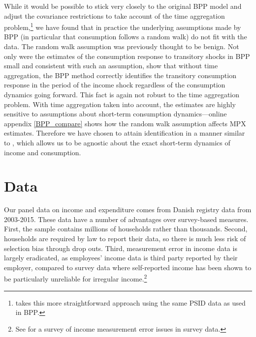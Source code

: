 \documentclass[titlepage]{\econtex}\newcommand{\texname}{ConsumptionHeterogeneity}
\begin{document}
	While it would be possible to stick very closely to the original BPP model and adjust the covariance restrictions to take account of the time aggregation problem,\footnote{\cite{crawley_time_2020} takes this more straightforward approach using the same PSID data as used in BPP.} we have found that in practice the underlying assumptions made by BPP (in particular that consumption follows a random walk) do not fit with the data. The random walk assumption was previously thought to be benign. Not only were the estimates of the consumption response to transitory shocks in BPP small and consistent with such an assumption, \cite{kaplan_how_2010} show that without time aggregation, the BPP method correctly identifies the transitory consumption response in the period of the income shock regardless of the consumption dynamics going forward. This fact is again not robust to the time aggregation problem. With time aggregation taken into account, the estimates are highly sensitive to assumptions about short-term consumption dynamics---online appendix \ref{BPP_compare} shows how the random walk assumption affects MPX estimates. Therefore we have chosen to attain identification in a manner similar to \cite{carroll_nature_1997}, which allows us to be agnostic about the exact short-term dynamics of income and consumption.
	
	\section{Data}
	Our panel data on income and expenditure comes from Danish registry data from 2003-2015. These data have a number of advantages over survey-based measures. First, the sample contains millions of households rather than thousands. Second, households are required by law to report their data, so there is much less risk of selection bias through drop outs. Third, measurement error in income data is largely eradicated, as employees' income data is third party reported by their employer, compared to survey data where self-reported income has been shown to be particularly unreliable for irregular income.\footnote{See \cite{david_income_nodate} for a survey of income measurement error issues in survey data.}
	
\end{document}
